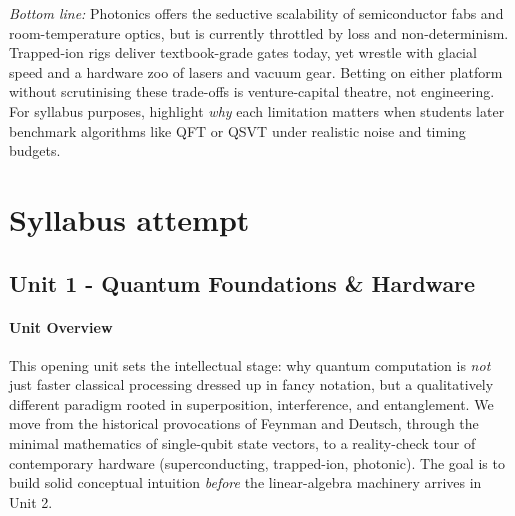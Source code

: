 \documentclass[11pt,a4paper]{article}
\begin{document}
\medskip
\noindent\emph{Bottom line:} Photonics offers the seductive scalability of semiconductor fabs and room-temperature optics, but is currently throttled by loss and non-determinism.  Trapped-ion rigs deliver textbook-grade gates today, yet wrestle with glacial speed and a hardware zoo of lasers and vacuum gear.  Betting on either platform without scrutinising these trade-offs is venture-capital theatre, not engineering.  For syllabus purposes, highlight \emph{why} each limitation matters when students later benchmark algorithms like QFT or QSVT under realistic noise and timing budgets.


\section{Syllabus attempt}

\subsection{Unit 1 - Quantum Foundations \& Hardware}


\paragraph{Unit Overview}
This opening unit sets the intellectual stage: why quantum computation is \emph{not} just faster classical processing dressed up in fancy notation, but a qualitatively different paradigm rooted in superposition, interference, and entanglement.  We move from the historical provocations of Feynman and Deutsch, through the minimal mathematics of single-qubit state vectors, to a reality-check tour of contemporary hardware (superconducting, trapped-ion, photonic).  The goal is to build solid conceptual intuition \emph{before} the linear-algebra machinery arrives in Unit 2.

\end{document}
